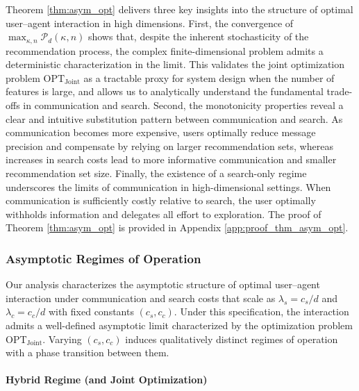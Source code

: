 \documentclass[12pt]{article}
\theoremstyle{definition}
\theoremstyle{remark}
\begin{document}
Theorem \ref{thm:asym_opt} delivers three key insights into the structure of optimal user–agent interaction in high dimensions. First, the convergence of $\max_{\kappa , n} \mathcal{P}_d(\kappa,n)$ shows that, despite the inherent stochasticity of the recommendation process, the complex finite-dimensional problem admits a deterministic characterization in the limit. This validates the joint optimization problem $\mathrm{OPT}_{\mathrm{Joint}}$ as a tractable proxy for system design when the number of features is large, and allows us to analytically understand the fundamental trade-offs in communication and search. Second, the monotonicity properties reveal a clear and intuitive substitution pattern between communication and search. As communication becomes more expensive, users optimally reduce message precision and compensate by relying on larger recommendation sets, whereas increases in search costs lead to more informative communication and smaller recommendation set size. Finally, the existence of a search-only regime underscores the limits of communication in high-dimensional settings. When communication is sufficiently costly relative to search, the user optimally withholds information and delegates all effort to exploration. The proof of Theorem \ref{thm:asym_opt} is provided in Appendix \ref{app:proof_thm_asym_opt}.

\subsubsection{Asymptotic Regimes of Operation}
\label{sec:asymptotic_regimes}

Our analysis characterizes the asymptotic structure of optimal user–agent interaction under communication and search costs that scale as $\lambda_s = c_s/d$ and $\lambda_c = c_c/d$ with fixed constants $(c_s,c_c)$. Under this specification, the interaction admits a well-defined asymptotic limit characterized by the optimization problem OPT$_{\text{Joint}}$. Varying $(c_s,c_c)$ induces qualitatively distinct regimes of operation with a phase transition between them.

\paragraph{Hybrid Regime (and Joint Optimization)}
\end{document}
